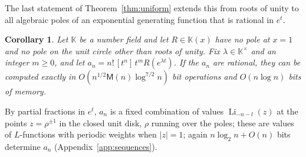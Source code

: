 \documentclass[11pt,reqno]{amsart}
\newtheorem{corollary}[theorem]{Corollary}
\theoremstyle{definition}
\theoremstyle{remark}
\newcommand{\Li}{\operatorname{Li}}
\newcommand{\Mul}{\mathsf{M}}
\begin{document}
The last statement of Theorem~\ref{thm:uniform} extends this from roots of unity to all algebraic poles of an
exponential generating function that is rational in $e^t$.

\begin{corollary}\label{cor:egf}
Let $\mathbb K$ be a number field and let $R \in \mathbb K(x)$ have no pole at $x = 1$ and no pole on the unit
circle other than roots of unity. Fix $\lambda \in \mathbb K^\times$ and an integer $m \ge 0$, and let
$a_n = n!\,[t^n]\,t^mR(e^{\lambda t})$. If the $a_n$ are rational, they can be computed exactly in
$O(n^{1/2}\Mul(n)\log^{7/2}n)$ bit operations and $O(n\log n)$ bits of memory.
\end{corollary}

By partial fractions in $e^t$, $a_n$ is a fixed combination of values $\Li_{-n-l}(z)$ at the points $z = \rho^{\pm1}$ in the closed
unit disk, $\rho$ running over the poles; these are values of $L$-functions with periodic weights when $|z| = 1$; again $n\log_2n + O(n)$ bits determine $a_n$
(Appendix~\ref{app:sequences}).
\end{document}

